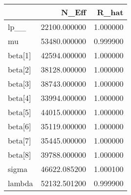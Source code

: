 \begin{tabular}{lrr}
\toprule
 & N_Eff & R_hat \\
\midrule
lp__ & 22100.000000 & 1.000000 \\
mu & 53480.000000 & 0.999900 \\
beta[1] & 42594.000000 & 1.000000 \\
beta[2] & 38128.000000 & 1.000000 \\
beta[3] & 38743.000000 & 1.000000 \\
beta[4] & 33994.000000 & 1.000000 \\
beta[5] & 44015.000000 & 1.000000 \\
beta[6] & 35119.000000 & 1.000000 \\
beta[7] & 35445.000000 & 1.000000 \\
beta[8] & 39788.000000 & 1.000000 \\
sigma & 46622.085200 & 1.000100 \\
lambda & 52132.501200 & 0.999900 \\
\bottomrule
\end{tabular}
